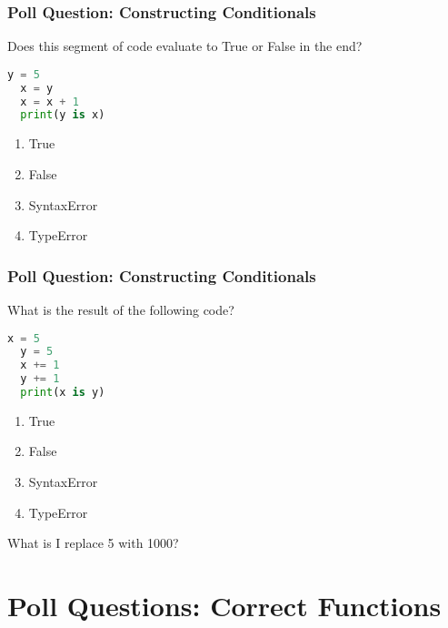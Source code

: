 \documentclass{beamer}
\begin{document}
%
%
\begin{frame}[fragile]
	\frametitle{Poll Question: Constructing Conditionals}
  Does this segment of code evaluate to True or False in the end?
  \begin{lstlisting}[language=Python, autogobble,basicstyle=\tiny,numbers=none]
  y = 5
  x = y
  x = x + 1
  print(y is x)
  \end{lstlisting}
  \vfill
  \begin{enumerate}[A]
    \item True
    \item False
    \item SyntaxError
    \item TypeError
  \end{enumerate}
\end{frame}

%
%
\begin{frame}[fragile]
	\frametitle{Poll Question: Constructing Conditionals}
  What is the result of the following code?
  \begin{lstlisting}[language=Python, autogobble,basicstyle=\tiny,numbers=none]
  x = 5
  y = 5
  x += 1
  y += 1
  print(x is y)
  \end{lstlisting}
  \vfill
  \begin{enumerate}[A]
    \item True
    \item False
    \item SyntaxError
    \item TypeError
  \end{enumerate}
  \pause
  What is I replace 5 with 1000?
\end{frame}

\section{Poll Questions: Correct Functions}
\end{document}
